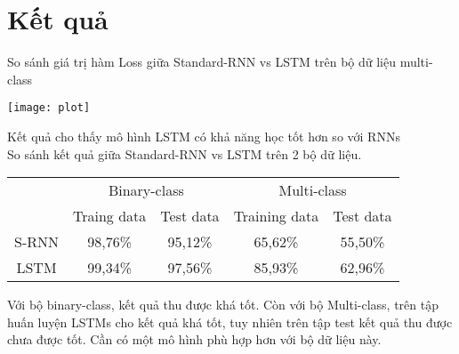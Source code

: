 \section{Kết quả}
So sánh giá trị hàm Loss giữa Standard-RNN vs LSTM trên bộ dữ liệu multi-class
	\begin{center}
	  \texttt{[image: plot]}
	  \label{plot}
	\end{center}
Kết quả cho thấy mô hình LSTM có khả năng học tốt hơn so với RNNs \\
So sánh kết quả giữa Standard-RNN vs LSTM trên 2 bộ dữ liệu. 
\begin{center}
\begin{tabular}{|c|c|c|c|c|}
\hline
 &\multicolumn{2}{c|}{Binary-class} & \multicolumn{2}{c|}{Multi-class}  \\
\cline{2-5}
 & Traing data & Test data & Training data & Test data  \\
\hline
S-RNN & 98,76\% & 95,12\% &65,62\% & 55,50\% \\
\hline
LSTM & 99,34\% &97,56\% &85,93\% & 62,96\%  \\
\hline
\end{tabular}
\end{center}
Với bộ binary-class, kết quả thu được khá tốt. Còn với bộ Multi-class, trên tập huấn luyện LSTMs cho kết quả khá tốt, tuy nhiên trên tập test kết quả thu được chưa được tốt. Cần có một mô hình phù hợp hơn với bộ dữ liệu này. 



